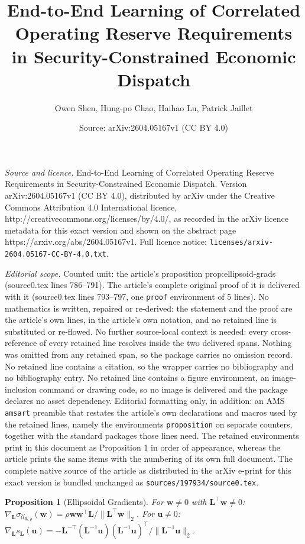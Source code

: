 \documentclass[10pt,a4paper]{amsart}
\title{End-to-End Learning of Correlated Operating Reserve Requirements in Security-Constrained Economic Dispatch}
\author{Owen Shen, Hung-po Chao, Haihao Lu, Patrick Jaillet}
\date{Source: arXiv:2604.05167v1 (CC BY 4.0)}
\newtheorem{proposition}{Proposition}
\newcommand{\bL}{\bm{L}}
\newcommand{\bu}{\bm{u}}
\newcommand{\bw}{\bm{w}}
\newcommand{\cU}{\mathcal{U}}
\begin{document}
\maketitle

\noindent\emph{Source and licence.} End-to-End Learning of Correlated Operating Reserve Requirements in Security-Constrained Economic Dispatch. Version arXiv:2604.05167v1 (CC BY 4.0), distributed by arXiv under the Creative Commons Attribution 4.0 International licence, http://creativecommons.org/licenses/by/4.0/, as recorded in the arXiv licence metadata for this exact version and shown on the abstract page https://arxiv.org/abs/2604.05167v1. Full licence notice: \texttt{licenses/arxiv-2604.05167-CC-BY-4.0.txt}.\par\smallskip

\noindent\textit{Editorial scope.} Counted unit: the article's proposition prop:ellipsoid-grads (source0.tex lines 786--791). The article's complete original proof of it is delivered with it (source0.tex lines 793--797, one \texttt{proof} environment of 5 lines). No mathematics is written, repaired or re-derived: the statement and the proof are the article's own lines, in the article's own notation, and no retained line is substituted or re-flowed.  No further source-local context is needed: every cross-reference of every retained line resolves inside the two delivered spans.  Nothing was omitted from any retained span, so the package carries no omission record.  No retained line contains a citation, so the wrapper carries no bibliography and no bibliography entry.  No retained line contains a figure environment, an image-inclusion command or drawing code, so no image is delivered and the package declares no asset dependency.  Editorial formatting only, in addition: an AMS \texttt{amsart} preamble that restates the article's own declarations and macros used by the retained lines, namely the environments \texttt{proposition} on separate counters, together with the standard packages those lines need.  The retained environments print in this document as Proposition 1 in order of appearance, whereas the article prints the same items with the numbering of its own full document.  The complete native source of the article as distributed in the arXiv e-print for this exact version is bundled unchanged as \texttt{sources/197934/source0.tex}.
\begin{proposition}[Ellipsoidal Gradients]\label{prop:ellipsoid-grads}
For $\bw\neq 0$ with $\bL^\top\bw\neq 0$:
$\nabla_{\bL}\sigma_{\cU_{\bL,\rho}}(\bw) = \rho\bw\bw^\top\bL/\|\bL^\top\bw\|_2$.
For $\bu\neq 0$:
$\nabla_{\bL}s_{\bL}(\bu) = -\bL^{-\top}(\bL^{-1}\bu)(\bL^{-1}\bu)^\top/\|\bL^{-1}\bu\|_2$.
\end{proposition}
\end{document}
